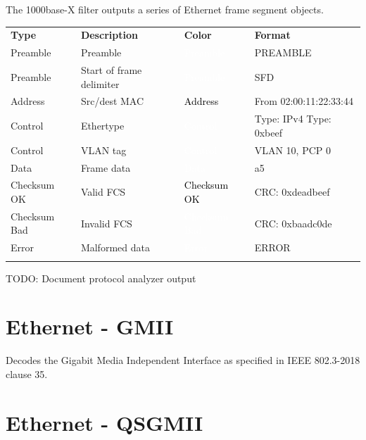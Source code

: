 The 1000base-X filter outputs a series of Ethernet frame segment objects.

\begin{tabularx}{16cm}{lllX}
\thickhline
\textbf{Type} & \textbf{Description} & \textbf{Color} & \textbf{Format} \\
\thickhline
Preamble & Preamble & \cellcolor{preamble}\textcolor{white}{Preamble} & PREAMBLE \\
\thickhline
Preamble & Start of frame delimiter & \cellcolor{preamble}\textcolor{white}{Preamble} & SFD \\
\thickhline
Address & Src/dest MAC & \cellcolor{address}\textcolor{black}{Address} & From 02:00:11:22:33:44 \\
\thickhline
Control & Ethertype & \cellcolor{control}\textcolor{white}{Control} & Type: IPv4 \newline Type: 0xbeef \\
\thickhline
Control & VLAN tag & \cellcolor{control}\textcolor{white}{Control} & VLAN 10, PCP 0 \\
\thickhline
Data & Frame data & \cellcolor{data}\textcolor{white}{Data} & a5 \\
\thickhline
Checksum OK & Valid FCS & \cellcolor{checksumok}\textcolor{black}{Checksum OK} & CRC: 0xdeadbeef \\
\thickhline
Checksum Bad & Invalid FCS & \cellcolor{checksumbad}\textcolor{white}{Checksum Bad} & CRC: 0xbaadc0de \\
\thickhline
Error & Malformed data & \cellcolor{error}\textcolor{white}{Error} & ERROR \\
\thickhline
\end{tabularx}

TODO: Document protocol analyzer output

\pagebreak
\section{Ethernet - GMII}

Decodes the Gigabit Media Independent Interface as specified in IEEE 802.3-2018 clause 35.

\pagebreak
\section{Ethernet - QSGMII}

